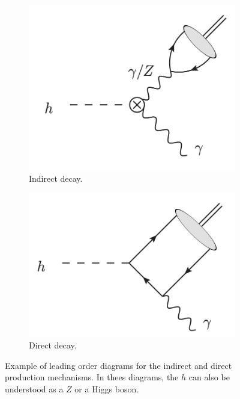 \begin{figure}[htbp]
  \centering
  \begin{subfigure}[htbp]{0.4\textwidth}
    \centering
    \includegraphics[width=\textwidth]{figures_and_tables/theory/indirect.png}
    \caption{Indirect decay.}
    \label{indirect}
  \end{subfigure}
  \hfill
  \begin{subfigure}[htbp]{0.4\textwidth}
    \centering
    \includegraphics[width=\textwidth]{figures_and_tables/theory/direct.png}
    \caption{Direct decay.}
    \label{direct}
  \end{subfigure}
  \caption{ Example of leading order diagrams for the indirect and direct production mechanisms. In thees diagrams, the $h$ can also be understood as a $Z$ or a Higgs boson.}
  \label{direct_indirect}
\end{figure}


